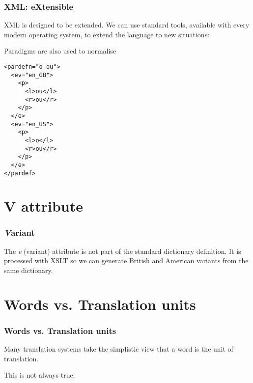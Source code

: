 \documentclass{beamer} %
\begin{document}
\begin{frame}
  \frametitle{XML: eXtensible}

  XML is designed to be extended. We can use standard tools, available with
  every modern operating system, to extend the language to new situations:

  \begin{exampleblock}{Paradigms are also used to normalise}
    \begin{footnotesize}
    \begin{alltt}
      <pardef n="o\_ou"> \\
      ~~<e v="en\_GB"> \\
      ~~~~<p> \\
      ~~~~~~<l>ou</l> \\
      ~~~~~~<r>ou</r> \\
      ~~~~</p> \\
      ~~</e> \\
      ~~<e v="en\_US"> \\
      ~~~~<p> \\
      ~~~~~~<l>o</l> \\
      ~~~~~~<r>ou</r> \\
      ~~~~</p> \\
      ~~</e> \\
      </pardef>
    \end{alltt}
    \end{footnotesize}
\end{exampleblock}
\end{frame}
\section{V attribute}
\begin{frame}
  \frametitle{{\it V}ariant}
    The {\it v} (variant) attribute is not part of the standard dictionary definition. It is processed
    with XSLT so we can generate British and American variants from the same dictionary.
\end{frame}

\section{Words vs. Translation units}
\begin{frame}
  \frametitle{Words vs. Translation units}
  Many translation systems take the simplistic view that a word is the unit of translation.

  This is not always true.
\end{frame}
\end{document}
